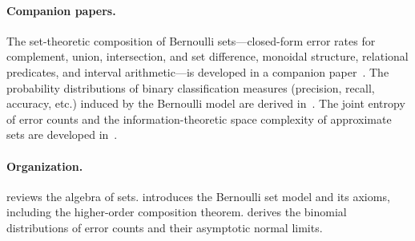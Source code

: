 \paragraph{Companion papers.}
The set-theoretic composition of Bernoulli sets---closed-form error rates for complement, union, intersection, and set difference, monoidal structure, relational predicates, and interval arithmetic---is developed in a companion paper~\cite{bernoulliComposition}.
The probability distributions of binary classification measures (precision, recall, accuracy, etc.) induced by the Bernoulli model are derived in~\cite{bernoulliMeasures}.
The joint entropy of error counts and the information-theoretic space complexity of approximate sets are developed in~\cite{bernoulliEntropy}.

\paragraph{Organization.}
 reviews the algebra of sets.
 introduces the Bernoulli set model and its axioms, including the higher-order composition theorem.
 derives the binomial distributions of error counts and their asymptotic normal limits.
